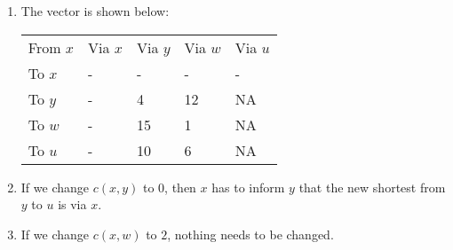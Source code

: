 \begin{enumerate}
    \item The vector is shown below:
          \begin{table}[H]
              \centering
              \begin{tabular}{lllll}
                  From $x$ & Via $x$ & Via $y$ & Via $w$ & Via $u$ \\
                  To $x$   & -       & -       & -       & -       \\
                  To $y$   & -       & 4       & 12      & NA      \\
                  To $w$   & -       & 15      & 1       & NA      \\
                  To $u$   & -       & 10      & 6       & NA
              \end{tabular}
          \end{table}
    \item If we change $c(x, y)$ to $0$, then $x$ has to inform $y$ that the new shortest from $y$ to $u$ is via $x$.
    \item If we change $c(x, w)$ to $2$, nothing needs to be changed.   
\end{enumerate}